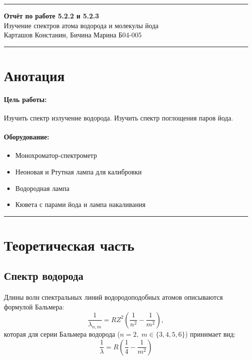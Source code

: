 \documentclass[a4paper,12pt]{article} %
\begin{document}


\hrule 	
\medskip
\begin{raggedright}
{\large \textbf{Отчёт по работе 5.2.2 и 5.2.3}}
\\
\medskip
{\Large Изучение спектров атома водорода и молекулы йода} 
\\
\medskip
{\large Карташов Констанин, Бичина Марина Б04-005}
\medskip
\hrule
\medskip
\end{raggedright}


\section{Анотация}

\paragraph{Цель работы:} 
Изучить спектр излучение водорода. Изучить спектр поглощения паров йода.

\paragraph{Оборудование:}
\begin{itemize}
\renewcommand{\labelitemi}{$\triangleright$}
\itemsep0em
\item Монохроматор-спектрометр
\item Неоновая и Ртутная лампа для калибровки
\item Водородная лампа
\item Кювета с парами йода и лампа накаливания
\end{itemize}


\medskip\hrule\medskip

\section{Теоретическая часть}

\subsection{Спектр водорода}

\paragraph{} Длины волн спектральных линий водородоподобных атомов описываются формулой Бальмера:
\[
\frac{1}{\lambda_{n,m}} = RZ^2 \left( \frac{1}{n^2} - \frac{1}{m^2} \right),
\]
\noindent которая для серии Бальмера водорода ($n = 2, \; m \in \{3, 4, 5, 6 \}$) принимает вид:
\begin{equation}
\frac{1}{\lambda} = R \left( \frac{1}{4} - \frac{1}{m^2} \right)
\label{e:balmer}
\end{equation}
\end{document}
